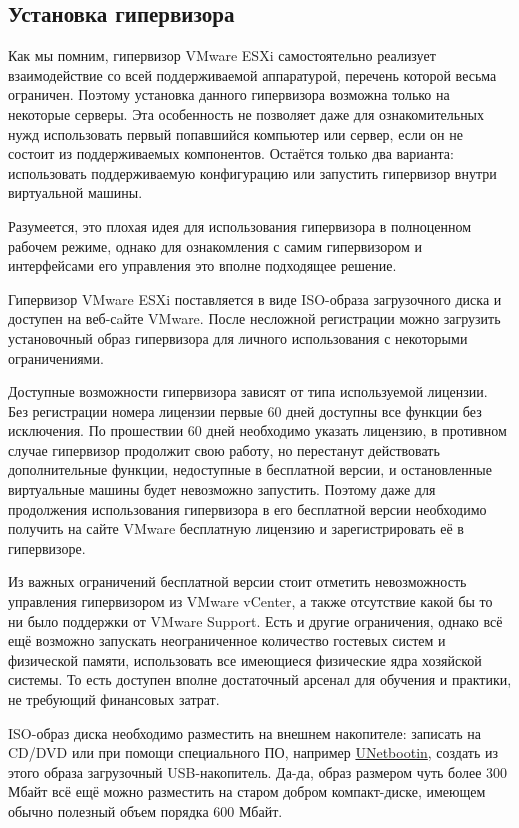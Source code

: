 \documentclass[14pt, a4paper]{article}
\begin{document}
\subsection*{Установка гипервизора}

Как мы помним, гипервизор VMware ESXi самостоятельно реализует взаимодействие со всей
поддерживаемой аппаратурой, перечень которой весьма ограничен. Поэтому установка данного
гипервизора возможна только на некоторые серверы. Эта особенность не позволяет даже для
ознакомительных нужд использовать первый попавшийся компьютер или сервер, если он не состоит
из поддерживаемых компонентов. Остаётся только два варианта: использовать поддерживаемую
конфигурацию или запустить гипервизор внутри виртуальной машины.

Разумеется, это плохая идея для использования гипервизора в полноценном рабочем режиме, однако
для ознакомления с самим гипервизором и интерфейсами его управления это вполне подходящее
решение.

Гипервизор VMware ESXi поставляется в виде ISO-образа загрузочного диска и доступен на веб-сaйте
VMware. После несложной регистрации можно загрузить установочный образ гипервизора для
личного использования с некоторыми ограничениями.

Доступные возможности гипервизора зависят от типа используемой лицензии. Без регистрации
номера лицензии первые 60 дней доступны все функции без исключения. По прошествии 60 дней
необходимо указать лицензию, в противном случае гипервизор продолжит свою работу, но перестанут
действовать дополнительные функции, недоступные в бесплатной версии, и остановленные
виртуальные машины будет невозможно запустить. Поэтому даже для продолжения использования
гипервизора в его бесплатной версии необходимо получить на сайте VMware бесплатную лицензию и
зарегистрировать её в гипервизоре.

Из важных ограничений бесплатной версии стоит отметить невозможность управления гипервизором
из VMware vCenter, а также отсутствие какой бы то ни было поддержки от VMware Support. Есть и
другие ограничения, однако всё ещё возможно запускать неограниченное количество гостевых систем
и физической памяти, использовать все имеющиеся физические ядра хозяйской системы. То есть
доступен вполне достаточный арсенал для обучения и практики, не требующий финансовых затрат.

ISO-образ диска необходимо разместить на внешнем накопителе: записать на CD/DVD или при
помощи специального ПО, например \href{https://unetbootin.github.io/}{UNetbootin}, создать из этого образа загрузочный
USB-накопитель. Да-да, образ размером чуть более 300 Мбайт всё ещё можно разместить на старом
добром компакт-диске, имеющем обычно полезный объем порядка 600 Мбайт.
\end{document}
